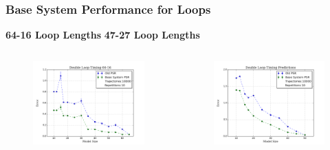 \documentclass{beamer}
\begin{document}
\begin{frame}
\frametitle{Base System Performance for Loops}




\hspace{1cm} \textbf{64-16 Loop Lengths}
\hspace{2.5cm} \textbf{47-27 Loop Lengths}

\begin{columns}[c]

\begin{figure}

\includegraphics[width=1.0\linewidth]{uCOREPICS/DoubleLoop64-16.png}
\end{figure}

\begin{figure}
\includegraphics[width=1.0\linewidth]{uCOREPICS/DoubleLoop47-27.png}
\end{figure}


\end{columns}
\end{frame}
\end{document}

